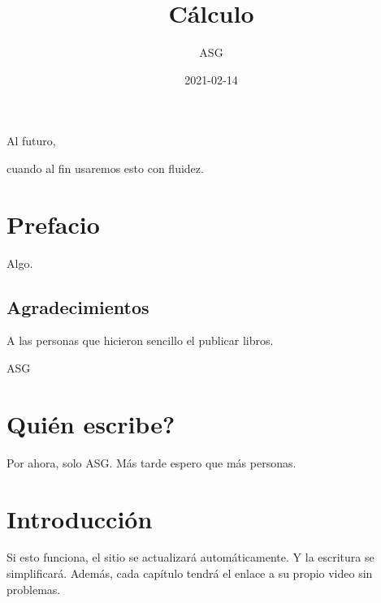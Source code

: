 \documentclass[
]{krantz}
\title{Cálculo}
\author{ASG}
\date{2021-02-14}
\theoremstyle{definition}
\theoremstyle{definition}
\theoremstyle{definition}
\theoremstyle{definition}
\theoremstyle{remark}
\begin{document}
\maketitle


\thispagestyle{empty}

\begin{center}
Al futuro,

cuando al fin usaremos esto con fluidez.
\end{center}

\setlength{\abovedisplayskip}{-5pt}
\setlength{\abovedisplayshortskip}{-5pt}

{
\hypersetup{linkcolor=}
\setcounter{tocdepth}{2}
\tableofcontents
}
\listoftables
\listoffigures
\hypertarget{prefacio}{%
\chapter*{Prefacio}\label{prefacio}}


Algo.

\hypertarget{agradecimientos}{%
\section*{Agradecimientos}\label{agradecimientos}}


A las personas que hicieron sencillo el publicar libros.

\begin{flushright}
ASG
\end{flushright}

\hypertarget{quiuxe9n-escribe}{%
\chapter{Quién escribe?}\label{quiuxe9n-escribe}}

Por ahora, solo ASG. Más tarde espero que más personas.

\mainmatter

\hypertarget{introducciuxf3n}{%
\chapter{Introducción}\label{introducciuxf3n}}

Si esto funciona, el sitio se actualizará automáticamente. Y la escritura se simplificará. Además, cada capítulo tendrá el enlace a su propio video sin problemas.
\end{document}
